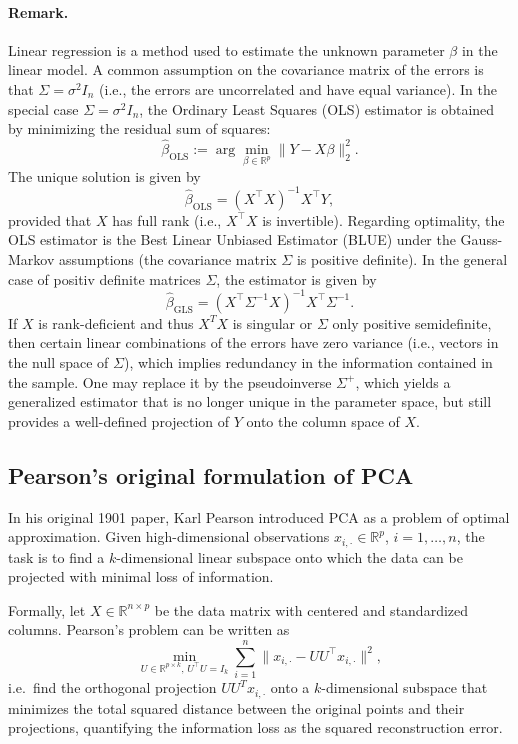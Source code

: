 \paragraph{Remark.}
Linear regression is a method used to estimate the unknown parameter \( \beta \) in the linear model. A common assumption on the covariance matrix of the errors is that 
\(\Sigma = \sigma^2 I_n\) (i.e., the errors are uncorrelated and have equal variance). In the special case \(\Sigma = \sigma^2 I_n\), the Ordinary Least Squares (OLS) estimator is obtained by minimizing the residual sum of squares:
\[
\hat{\beta}_{\text{OLS}} := \arg\min_{\beta \in \mathbb{R}^p} \| Y - X\beta \|_2^2.
\]
The unique solution is given by
\[
\hat{\beta}_{\text{OLS}} = (X^\top X)^{-1} X^\top Y,
\]
provided that \( X \) has full rank (i.e., \( X^\top X \) is invertible). Regarding optimality, the OLS estimator is the Best Linear Unbiased Estimator (BLUE) under the Gauss-Markov assumptions (the covariance matrix \(\Sigma\) is positive definite). In the general case of positiv definite matrices $\Sigma$, the estimator is given by
\[
\hat\beta_{\text{GLS}} = (X^\top \Sigma^{-1} X)^{-1} X^\top \Sigma^{-1}.
\]    
If \(X\) is rank-deficient and thus $X^TX$ is singular or \(\Sigma\) only positive semidefinite, then certain linear combinations of the errors have zero variance (i.e., vectors in the null space of $\Sigma$), which implies redundancy in the information contained in the sample. One may replace it by the pseudoinverse $\Sigma^+$, which yields a generalized estimator that is no longer unique in the parameter space, but still provides a well-defined projection of $Y$ onto the column space of $X$.


\subsection{Pearson's original formulation of PCA}

In his original 1901 paper, Karl Pearson introduced PCA as a problem of optimal approximation. Given high-dimensional observations $x_{i,\cdot} \in \mathbb{R}^p$, $i=1,\dots,n$, the task is to find a $k$-dimensional linear subspace onto which the data can be projected with minimal loss of information.

Formally, let $X \in \mathbb{R}^{n \times p}$ be the data matrix with centered and standardized columns. Pearson’s problem can be written as
\[
\min_{U \in \mathbb{R}^{p \times k}, \, U^\top U = I_k} 
\sum_{i=1}^n \| x_{i,\cdot} - U U^\top x_{i,\cdot} \|^2,
\]
i.e.\ find the orthogonal projection $UU^Tx_{i,\cdot}$ onto a $k$-dimensional subspace that minimizes the total squared distance between the original points and their projections, quantifying the information loss as the squared reconstruction error.

